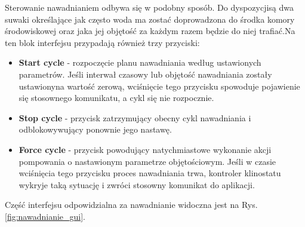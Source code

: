 Sterowanie nawadnianiem odbywa się w podobny sposób. Do dyspozycji\linebreak są dwa suwaki określające jak często woda ma zostać doprowadzona do środka komory środowiskowej oraz jaka jej objętość za każdym razem będzie do niej trafiać.\linebreak Na ten blok interfejsu przypadają również trzy przyciski:
\begin{itemize}
	\item \textbf{Start cycle} - rozpoczęcie planu nawadniania według ustawionych parametrów. Jeśli interwał czasowy lub objętość nawadniania zostały ustawiony\linebreak na wartość zerową, wciśnięcie tego przycisku spowoduje pojawienie się stosownego komunikatu, a cykl się nie rozpocznie.
	\item \textbf{Stop cycle} - przycisk zatrzymujący obecny cykl nawadniania i odblokowywujący ponownie jego nastawę.
	\item \textbf{Force cycle} - przycisk powodujący natychmiastowe wykonanie akcji pompowania o nastawionym parametrze objętościowym. Jeśli w czasie wciśnięcia tego przycisku proces nawadniania trwa, kontroler klinostatu wykryje taką sytuację i zwróci stosowny komunikat do aplikacji.
\end{itemize}
Część interfejsu odpowidzialna za nawadnianie widoczna jest na Rys. \ref{fig:nawadnianie_gui}.\\

